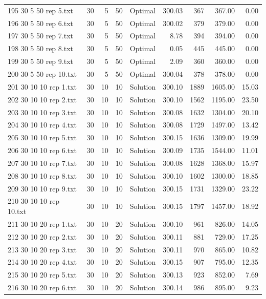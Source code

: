 \begin{longtable}{lrrllrrrr}
195 30 5 50 rep 5.txt & 30 & 5 & 50 & Optimal & 300.03 & 367 & 367.00 &  0.00\\
196 30 5 50 rep 6.txt & 30 & 5 & 50 & Optimal & 300.02 & 379 & 379.00 &  0.00\\
197 30 5 50 rep 7.txt & 30 & 5 & 50 & Optimal &  8.78 & 394 & 394.00 &  0.00\\
198 30 5 50 rep 8.txt & 30 & 5 & 50 & Optimal &  0.05 & 445 & 445.00 &  0.00\\
199 30 5 50 rep 9.txt & 30 & 5 & 50 & Optimal &  2.09 & 360 & 360.00 &  0.00\\
200 30 5 50 rep 10.txt & 30 & 5 & 50 & Optimal & 300.04 & 378 & 378.00 &  0.00\\
201 30 10 10 rep 1.txt & 30 & 10 & 10 & Solution & 300.10 & 1889 & 1605.00 & 15.03\\
202 30 10 10 rep 2.txt & 30 & 10 & 10 & Solution & 300.10 & 1562 & 1195.00 & 23.50\\
203 30 10 10 rep 3.txt & 30 & 10 & 10 & Solution & 300.08 & 1632 & 1304.00 & 20.10\\
204 30 10 10 rep 4.txt & 30 & 10 & 10 & Solution & 300.08 & 1729 & 1497.00 & 13.42\\
205 30 10 10 rep 5.txt & 30 & 10 & 10 & Solution & 300.15 & 1636 & 1309.00 & 19.99\\
206 30 10 10 rep 6.txt & 30 & 10 & 10 & Solution & 300.09 & 1735 & 1544.00 & 11.01\\
207 30 10 10 rep 7.txt & 30 & 10 & 10 & Solution & 300.08 & 1628 & 1368.00 & 15.97\\
208 30 10 10 rep 8.txt & 30 & 10 & 10 & Solution & 300.10 & 1602 & 1300.00 & 18.85\\
209 30 10 10 rep 9.txt & 30 & 10 & 10 & Solution & 300.15 & 1731 & 1329.00 & 23.22\\
210 30 10 10 rep 10.txt & 30 & 10 & 10 & Solution & 300.15 & 1797 & 1457.00 & 18.92\\
211 30 10 20 rep 1.txt & 30 & 10 & 20 & Solution & 300.10 & 961 & 826.00 & 14.05\\
212 30 10 20 rep 2.txt & 30 & 10 & 20 & Solution & 300.11 & 881 & 729.00 & 17.25\\
213 30 10 20 rep 3.txt & 30 & 10 & 20 & Solution & 300.11 & 970 & 865.00 & 10.82\\
214 30 10 20 rep 4.txt & 30 & 10 & 20 & Solution & 300.15 & 907 & 795.00 & 12.35\\
215 30 10 20 rep 5.txt & 30 & 10 & 20 & Solution & 300.13 & 923 & 852.00 &  7.69\\
216 30 10 20 rep 6.txt & 30 & 10 & 20 & Solution & 300.14 & 986 & 895.00 &  9.23\\

\end{longtable}
